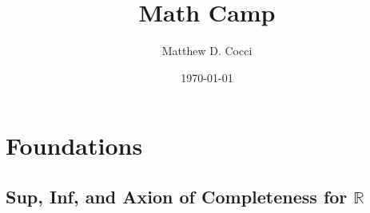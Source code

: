 \documentclass[12pt]{book}
\author{Matthew D. Cocci}
\title{Math Camp}
\date{\today}
\numberwithin{equation}{section} %
\theoremstyle{plain}
\theoremstyle{definition}
\theoremstyle{remark}
\newcommand{\R}{\mathbb{R}}
\newcommand{\Rn}{\mathbb{R}^n}
\newcommand{\Cn}{\mathbb{C}^n}
\begin{document}
\maketitle

\tableofcontents








\chapter{Foundations}


\section{Sup, Inf, and Axion of Completeness for $\R$}
\end{document}
